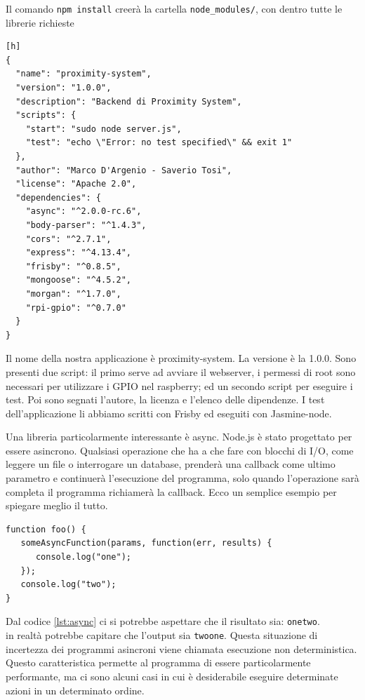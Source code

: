 Il comando \texttt{npm install} creerà la cartella \texttt{node\_modules/}, con dentro tutte le librerie richieste

\begin{lstlisting}[caption={package.json}, style=javaScriptCode][h]
{
  "name": "proximity-system",
  "version": "1.0.0",
  "description": "Backend di Proximity System",
  "scripts": {
    "start": "sudo node server.js",
    "test": "echo \"Error: no test specified\" && exit 1"
  },
  "author": "Marco D'Argenio - Saverio Tosi",
  "license": "Apache 2.0",
  "dependencies": {
    "async": "^2.0.0-rc.6",
    "body-parser": "^1.4.3",
    "cors": "^2.7.1",
    "express": "^4.13.4",
    "frisby": "^0.8.5",
    "mongoose": "^4.5.2",
    "morgan": "^1.7.0",
    "rpi-gpio": "^0.7.0"
  }
}
\end{lstlisting}

Il nome della nostra applicazione è proximity-system. 
La versione è la 1.0.0. 
Sono presenti due script: il primo serve ad avviare il webserver, i permessi di root sono necessari per utilizzare i GPIO nel raspberry; ed un secondo script per eseguire i test. 
Poi sono segnati l'autore, la licenza e l'elenco delle dipendenze. 
I test dell'applicazione li abbiamo scritti con Frisby ed eseguiti con Jasmine-node.

Una libreria particolarmente interessante è async. 
Node.js è stato progettato per essere asincrono.
Qualsiasi operazione che ha a che fare con blocchi di I/O, come leggere un file o interrogare un database, prenderà una callback come ultimo parametro e continuerà l'esecuzione del programma, 
solo quando l'operazione sarà completa il programma richiamerà la callback. 
Ecco un semplice esempio per spiegare meglio il tutto.

\begin{lstlisting}[caption={operazioni asincrone}, style=javaScriptCode, label={lst:async}]
function foo() {
   someAsyncFunction(params, function(err, results) {
      console.log("one");
   });
   console.log("two");
}
\end{lstlisting}

Dal codice \ref{lst:async} ci si potrebbe aspettare che il risultato sia:
\texttt{onetwo}.\\
in realtà potrebbe capitare che l’output sia \texttt{twoone}.
Questa situazione di incertezza dei programmi asincroni viene chiamata esecuzione non deterministica. 
Questo caratteristica permette al programma di essere particolarmente performante, ma ci sono alcuni casi in cui è desiderabile eseguire determinate azioni in un determinato ordine. 

